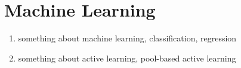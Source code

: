 \chapter{Machine Learning}

\begin{enumerate}
    \item something about machine learning, classification, regression
    \item something about active learning, pool-based active learning
\end{enumerate}

